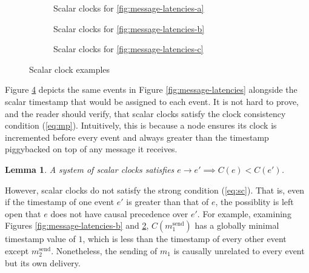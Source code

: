 \documentclass[]             %
{NASA}                       %
\newtheorem{lemma}[theorem]{Lemma}
\theoremstyle{definition}
\begin{document}
\begin{figure}[p]
  \setlength\belowcaptionskip{5ex}

  \begin{subfigure}{1\textwidth}
    \centering 
    \caption{Scalar clocks for \ref{fig:message-latencies-a}}
    \label{fig:message-latencies-scalar-a}
  \end{subfigure}

  \begin{subfigure}{1\textwidth}
    \centering 
    \caption{Scalar clocks for \ref{fig:message-latencies-b}}
    \label{fig:message-latencies-scalar-b}
  \end{subfigure}


  \begin{subfigure}{1\textwidth}
    \centering 
    \caption{Scalar clocks for \ref{fig:message-latencies-c}}
    \label{fig:message-latencies-scalar-c}
  \end{subfigure}
  \caption{Scalar clock examples}
  \label{fig:message-latencies-scalar}
\end{figure}

\afterpage{\clearpage}

Figure \ref{fig:message-latencies-scalar} depicts the same events in
Figure \ref{fig:message-latencies} alongside the scalar timestamp that
would be assigned to each event. It is not hard to prove, and the
reader should verify, that scalar clocks satisfy the clock consistency
condition (\ref{eq:mp}). Intuitively, this is because a node ensures
its clock is incremented before every event and always greater than
the timestamp piggybacked on top of any message it receives.

\begin{lemma}
  A system of scalar clocks satisfies $e \to e' \implies C(e) < C(e')$.
\end{lemma}

However, scalar clocks do not satisfy the strong condition
(\ref{eq:sc}). That is, even if the timestamp of one event $e'$ is
greater than that of $e$, the possiblity is left open that $e$ does
not have causal precedence over $e'$. For example, examining Figures
\ref{fig:message-latencies-b} and
\ref{fig:message-latencies-scalar-b}, $C(m_1^\textrm{send})$ has a
globally minimal timestamp value of $1$, which is less than the
timestamp of every other event except
$m_2^\textrm{send}$. Nonetheless, the sending of $m_1$ is causally
unrelated to every event but its own delivery.
\end{document}
